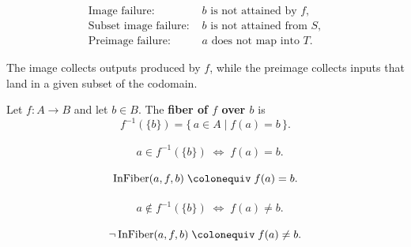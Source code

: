 \begin{remark*}
\[
\begin{aligned}
\text{Image failure: } 
&b \text{ is not attained by } f, \\
\text{Subset image failure: } 
&b \text{ is not attained from } S, \\
\text{Preimage failure: } 
&a \text{ does not map into } T.
\end{aligned}
\]
\end{remark*}

\begin{remark*}[Interpretation]
The image collects outputs produced by $f$, while the preimage collects
inputs that land in a given subset of the codomain.
\end{remark*}


\begin{tcolorbox}[title={Definition --- Fiber}]
\begin{definition}[Fiber]
\label{def:alg-fiber}
Let $f : A \to B$ and let $b \in B$. The \textbf{fiber of $f$ over $b$} is
\[
  f^{-1}(\{b\}) = \{\, a \in A \mid f(a) = b \,\}.
\]
\end{definition}
\end{tcolorbox}

\begin{remark*}
\[
\begin{aligned}
&a \in f^{-1}(\{b\})
\;\Longleftrightarrow\;
f(a) = b.
\end{aligned}
\]
\end{remark*}

\begin{remark*}
\[
\operatorname{InFiber}(a,f,b)
\;\colonequiv\;
f(a) = b.
\]
\end{remark*}

\begin{remark*}
\[
\begin{aligned}
&a \notin f^{-1}(\{b\})
\;\Longleftrightarrow\;
f(a) \ne b.
\end{aligned}
\]
\end{remark*}

\begin{remark*}
\[
\neg \operatorname{InFiber}(a,f,b)
\;\colonequiv\;
f(a) \ne b.
\]
\end{remark*}

